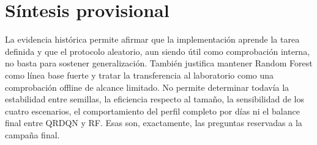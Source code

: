
\section{Síntesis provisional}
\label{sec:resultados-sintesis}

La evidencia histórica permite afirmar que la implementación aprende la tarea definida y que el protocolo aleatorio, aun siendo útil como comprobación interna, no basta para sostener generalización. También justifica mantener Random Forest como línea base fuerte y tratar la transferencia al laboratorio como una comprobación offline de alcance limitado. No permite determinar todavía la estabilidad entre semillas, la eficiencia respecto al tamaño, la sensibilidad de los cuatro escenarios, el comportamiento del perfil completo por días ni el balance final entre QRDQN y RF. Esas son, exactamente, las preguntas reservadas a la campaña final.
